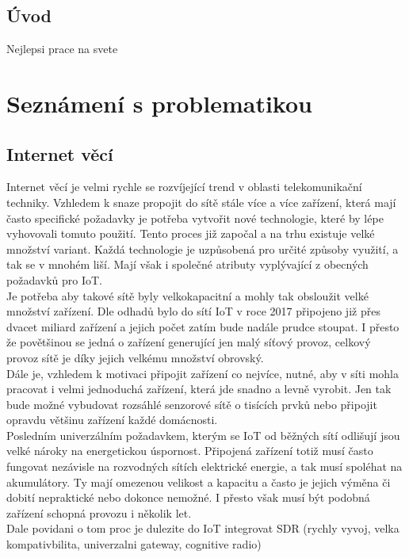\documentclass{ctuthesis}
\begin{document}
\maketitle

\chapter{Úvod}
Nejlepsi prace na svete

\part{Seznámení s problematikou}
\chapter{Internet věcí}
Internet věcí je velmi rychle se rozvíjející trend v oblasti telekomunikační techniky. Vzhledem k snaze propojit do sítě stále více a více zařízení, která mají často specifické požadavky je potřeba vytvořit nové technologie, které by lépe vyhovovali tomuto použití. Tento proces již započal a na trhu existuje velké množství variant. 
Každá technologie je uzpůsobená pro určité způsoby využití, a tak se v mnohém liší. Mají však i společné atributy vyplývající z obecných požadavků pro IoT.\\
Je potřeba aby takové sítě byly velkokapacitní a mohly tak obsloužit velké množství zařízení. Dle odhadů bylo do sítí IoT v roce 2017 připojeno již přes dvacet miliard zařízení a jejich počet zatím bude nadále prudce stoupat. \cite{statista2018} I přesto že povětšinou se jedná o zařízení generující jen malý síťový provoz, celkový provoz sítě je díky jejich velkému množství obrovský.\\
Dále je, vzhledem k motivaci připojit zařízení co nejvíce, nutné, aby v síti mohla pracovat i velmi jednoduchá zařízení, která jde snadno a levně vyrobit. Jen tak bude možné vybudovat rozsáhlé senzorové sítě o tisících prvků nebo připojit opravdu většinu zařízení každé domácnosti.\\
Posledním univerzálním požadavkem, kterým se IoT od běžných sítí odlišují jsou velké nároky na energetickou úspornost. Připojená zařízení totiž musí často fungovat nezávisle na rozvodných sítích elektrické energie, a tak musí spoléhat na akumulátory. Ty mají omezenou velikost a kapacitu a často je jejich výměna či dobití nepraktické nebo dokonce nemožné. I přesto však musí být podobná zařízení schopná provozu i několik let.
\\
Dale povidani o tom proc je dulezite do IoT integrovat SDR (rychly vyvoj, velka kompativbilita, univerzalni gateway, cognitive radio)
\end{document}
